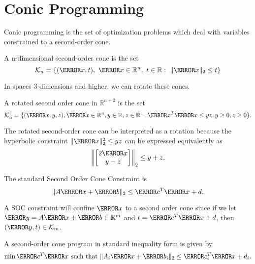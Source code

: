 \section{Conic Programming}
Conic programming is the set of optimization problems which deal with variables constrained to a second-order cone.
\begin{definition}
	A n-dimensional second-order cone is the set \[
		\mathcal{K}_n = \{(\V{x}, t),\ \V{x}\in\mathbb{R}^n,\ t\in\mathbb{R}:\ \|\V{x}\|_2 \leq t\}
	\]
	\label{defn:soc}
\end{definition}
In spaces 3-dimensions and higher, we can rotate these cones.
\begin{definition}
	A rotated second order cone in $\mathbb{R}^{n+2}$ is the set \[
		\mathcal{K}_n^r = \{(\V{x}, y, z),\V{x}\in\mathbb{R}^n, y\in\mathbb{R}, z\in\mathbb{R}:\ \V{x}^T\V{x} \leq yz, y\geq 0, z \geq 0 \}.
	\]
	\label{defn:rot-soc}
\end{definition}
The rotated second-order cone can be interpreted as a rotation because the hyperbolic constraint $\|\V{x}\|_2^2\leq yz$ can be expressed equivalently as
\[
	\left\lVert\begin{bmatrix}2\V{x} \\ y - z\end{bmatrix}\right\rVert_2 \leq y+z.
\]
\begin{definition}
	The standard Second Order Cone Constraint is \[
		\|A\V{x}+\V{b}\|_2 \leq \V{c}^T\V{x} +d.
	\]
	\label{defn:soc-const}
\end{definition}
A SOC constraint will confine $\V{x}$ to a second order cone since if we let $\V{y} = A\V{x}+\V{b} \in \mathbb{R}^m$ and $t = \V{c}^T\V{x}+d$, then $(\V{y}, t)\in\mathcal{K}_m$.
\begin{definition}
	A second-order cone program in standard inequality form is given by
	\[
		\min \V{c}^T\V{x} \text{ such that } \|A_i\V{x}+\V{b}_i\|_2 \leq \V{c}_i^T\V{x}+d_i.
	\]
	\label{defn:soc-program}
\end{definition}
